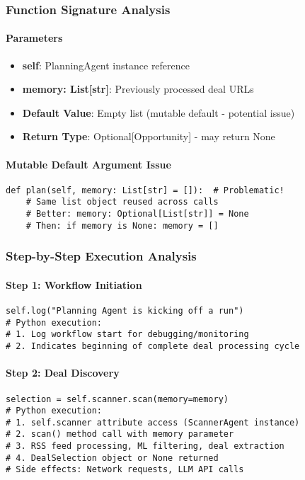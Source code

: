 \subsubsection{Function Signature Analysis}

\paragraph{Parameters}
\begin{itemize}
\item \textbf{self}: PlanningAgent instance reference
\item \textbf{memory: List[str]}: Previously processed deal URLs
\item \textbf{Default Value}: Empty list (mutable default - potential issue)
\item \textbf{Return Type}: Optional[Opportunity] - may return None
\end{itemize}

\paragraph{Mutable Default Argument Issue}
\begin{lstlisting}[caption=Mutable Default Problem]
def plan(self, memory: List[str] = []):  # Problematic!
    # Same list object reused across calls
    # Better: memory: Optional[List[str]] = None
    # Then: if memory is None: memory = []
\end{lstlisting}

\subsubsection{Step-by-Step Execution Analysis}

\paragraph{Step 1: Workflow Initiation}
\begin{lstlisting}[caption=Planning Process Start]
self.log("Planning Agent is kicking off a run")
# Python execution:
# 1. Log workflow start for debugging/monitoring
# 2. Indicates beginning of complete deal processing cycle
\end{lstlisting}

\paragraph{Step 2: Deal Discovery}
\begin{lstlisting}[caption=Scanner Agent Invocation]
selection = self.scanner.scan(memory=memory)
# Python execution:
# 1. self.scanner attribute access (ScannerAgent instance)
# 2. scan() method call with memory parameter
# 3. RSS feed processing, ML filtering, deal extraction
# 4. DealSelection object or None returned
# Side effects: Network requests, LLM API calls
\end{lstlisting}

